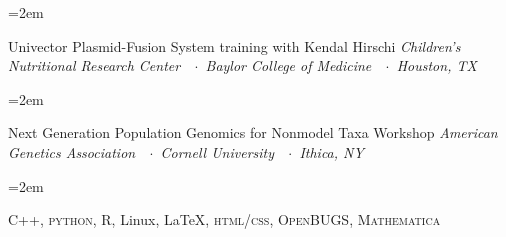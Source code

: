 \documentclass[10pt]{scrartcl}
\newcommand{\Description}[1]{\hangindent=2em\hangafter=0\noindent\raggedright\footnotesize{#1}\par\normalsize\vspace{0.5em}} %
\begin{document}
\begin{cv}{}
\vspace{0.5em}

\Description{Univector Plasmid-Fusion System training with Kendal Hirschi\newline
 \textit{Children’s Nutritional Research Center\ \ $\cdotp$\ Baylor College of Medicine\ \ $\cdotp$\ Houston, TX}}

\Description{Next Generation Population Genomics for Nonmodel Taxa Workshop\newline
 \textit{American Genetics Association\ \ $\cdotp$\ Cornell University\ \ $\cdotp$\ Ithica, NY}}


\vspace{0.5em} %



\vspace{0.5em}

\Description{C++, \textsc{python}, R, Linux, \LaTeX, \textsc{html/css, OpenBUGS, Mathematica}}





\vspace{0.5em} %



\end{cv}
\end{document}
